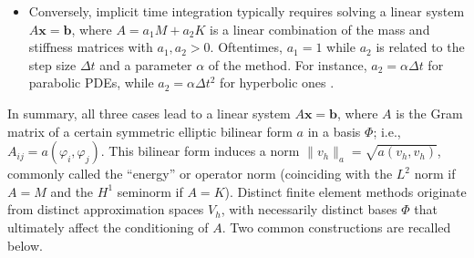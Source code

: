 \documentclass{article}
\numberwithin{equation}{section}
\theoremstyle{definition}
\begin{document}
\begin{itemize}
\begin{equation*}
    \end{equation*}
    Analogous systems arise in explicit time integration of finite element discretizations of parabolic or hyperbolic PDEs \cite{quarteroni2009numerical,hughes2012finite,bathe2006finite}.  
    \item Conversely, implicit time integration typically requires solving a linear system $A\bm{x}=\bm{b}$, where $A=a_1M+a_2K$ is a linear combination of the mass and stiffness matrices with $a_1,a_2>0$. Oftentimes, $a_1=1$ while $a_2$ is related to the step size $\Delta t$ and a parameter $\alpha$ of the method. For instance, $a_2=\alpha \Delta t$ for parabolic PDEs, while $a_2=\alpha \Delta t^2$ for hyperbolic ones \cite{quarteroni2009numerical,hughes2012finite,bathe2006finite}.
\end{itemize}

In summary, all three cases lead to a linear system $A\bm{x}=\bm{b}$, where $A$ is the Gram matrix of a certain symmetric elliptic bilinear form $a$ in a basis $\Phi$; i.e., $A_{ij}=a(\varphi_i,\varphi_j)$. This bilinear form induces a norm $\|v_h\|_a = \sqrt{a(v_h,v_h)}$, commonly called the ``energy'' or operator norm (coinciding with the $L^2$ norm if $A=M$ and the $H^1$ seminorm if $A=K$). Distinct finite element methods originate from distinct approximation spaces $V_h$, with necessarily distinct bases $\Phi$ that ultimately affect the conditioning of $A$. Two common constructions are recalled below.
\end{document}
